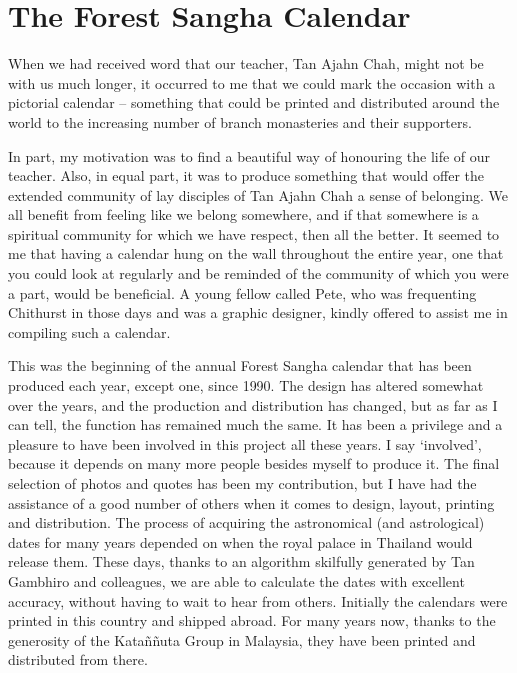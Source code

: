 \chapter{The Forest Sangha Calendar}

When we had received word that our teacher, Tan Ajahn Chah, might not be
with us much longer, it occurred to me that we could mark the occasion
with a pictorial calendar -- something that could be printed and
distributed around the world to the increasing number of branch
monasteries and their supporters.

In part, my motivation was to find a beautiful way of honouring the life
of our teacher. Also, in equal part, it was to produce something that
would offer the extended community of lay disciples of Tan Ajahn Chah a
sense of belonging. We all benefit from feeling like we belong
somewhere, and if that somewhere is a spiritual community for which we
have respect, then all the better. It seemed to me that having a
calendar hung on the wall throughout the entire year, one that you could
look at regularly and be reminded of the community of which you were a
part, would be beneficial. A young fellow called Pete, who was
frequenting Chithurst in those days and was a graphic designer, kindly
offered to assist me in compiling such a calendar.

This was the beginning of the annual Forest Sangha calendar\cite{calendar}
that has been produced each year, except one,
since 1990. The design has altered somewhat over the years, and the
production and distribution has changed, but as far as I can tell, the
function has remained much the same. It has been a privilege and a
pleasure to have been involved in this project all these years. I say
`involved', because it depends on many more people besides myself to
produce it. The final selection of photos and quotes has been my
contribution, but I have had the assistance of a good number of others
when it comes to design, layout, printing and distribution. The process
of acquiring the astronomical (and astrological) dates for many years
depended on when the royal palace in Thailand would release them. These
days, thanks to an algorithm skilfully generated by Tan Gambhiro and
colleagues, we are able to calculate the dates with excellent accuracy,
without having to wait to hear from others. Initially the calendars were
printed in this country and shipped abroad. For many years now, thanks
to the generosity of the Kataññuta Group in Malaysia, they have been
printed and distributed from there.

